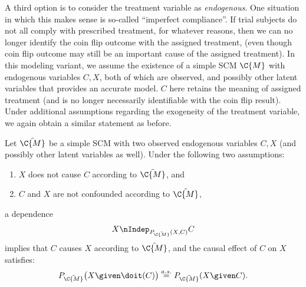 A third option is to consider the treatment variable as \emph{endogenous}.
One situation in which this makes sense is so-called ``imperfect compliance''.
If trial subjects do not all comply with prescribed treatment, for whatever reasons, 
then we can no longer identify the coin flip outcome with the assigned treatment,
(even though coin flip outcome may still be an important cause of the assigned
treatment). In this modeling variant, 
we assume the existence of a simple SCM $\C{M}$
with endogenous variables $C, X$, both of which are observed, and possibly other
latent variables that provides an accurate model. $C$ here retains the meaning
of assigned treatment (and is no longer necessarily identifiable with the coin
flip result).
Under additional assumptions regarding the exogeneity of the treatment variable,
we again obtain a similar statement as before.
\begin{Prp}\label{prp:RCT3}
Let $\tilde{\C{M}}$ be a simple SCM with two observed endogenous variables $C, X$
(and possibly other latent variables as well).
Under the following two assumptions:
  \begin{enumerate}
    \item $X$ does not cause $C$ according to $\tilde{\C{M}}$, and
    \item $C$ and $X$ are not confounded according to $\tilde{\C{M}}$,
  \end{enumerate}
a dependence 
  \begin{equation}\label{eq:RCT_CI_statement3}
    X \nIndep_{P_{\tilde{\C{M}}}(X,C)} C
  \end{equation}
  implies that $C$ causes $X$ according to $\tilde{\C{M}}$, and the causal effect of $C$ on $X$ satisfies:
  \begin{equation}\label{eq:RCT_causal_effect3}
    P_{\tilde{\C{M}}}\big(X \given \doit(C)\big) \stackrel{a.s.}{=} P_{\tilde{\C{M}}}(X \given C).
  \end{equation}
\end{Prp}

